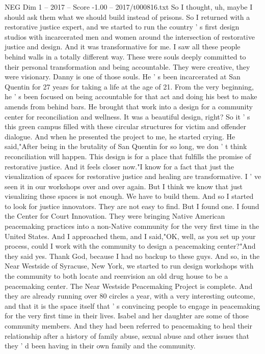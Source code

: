 \begin{textsample}{NEG Dim 1 – 2017 – Score -1.00 – 2017/t000816.txt}
So I thought, uh, maybe I should ask them what we should build instead of prisons.
So I returned with a restorative justice expert, and we started to run the country ' s first design studios with incarcerated men and women around the intersection of restorative justice and design.
And it was transformative for me.
I saw all these people behind walls in a totally different way.
These were souls deeply committed to their personal transformation and being accountable.
They were creative, they were visionary.
Danny is one of those souls.
He ' s been incarcerated at San Quentin for 27 years for taking a life at the age of 21.
From the very beginning, he ' s been focused on being accountable for that act and doing his best to make amends from behind bars.
He brought that work into a design for a community center for reconciliation and wellness.
It was a beautiful design, right?
So it ' s this green campus filled with these circular structures for victim and offender dialogue.
And when he presented the project to me, he started crying.
He said,"After being in the brutality of San Quentin for so long, we don ' t think reconciliation will happen.
This design is for a place that fulfills the promise of restorative justice.
And it feels closer now."I know for a fact that just the visualization of spaces for restorative justice and healing are transformative.
I ' ve seen it in our workshops over and over again.
But I think we know that just visualizing these spaces is not enough.
We have to build them.
And so I started to look for justice innovators.
They are not easy to find.
But I found one.
I found the Center for Court Innovation.
They were bringing Native American peacemaking practices into a non-Native community for the very first time in the United States.
And I approached them, and I said,"OK, well, as you set up your process, could I work with the community to design a peacemaking center?"And they said yes.
Thank God, because I had no backup to these guys.
And so, in the Near Westside of Syracuse, New York, we started to run design workshops with the community to both locate and reenvision an old drug house to be a peacemaking center.
The Near Westside Peacemaking Project is complete.
And they are already running over 80 circles a year, with a very interesting outcome, and that it is the space itself that ' s convincing people to engage in peacemaking for the very first time in their lives.
Isabel and her daughter are some of those community members.
And they had been referred to peacemaking to heal their relationship after a history of family abuse, sexual abuse and other issues that they ' d been having in their own family and the community.

\end{textsample}
